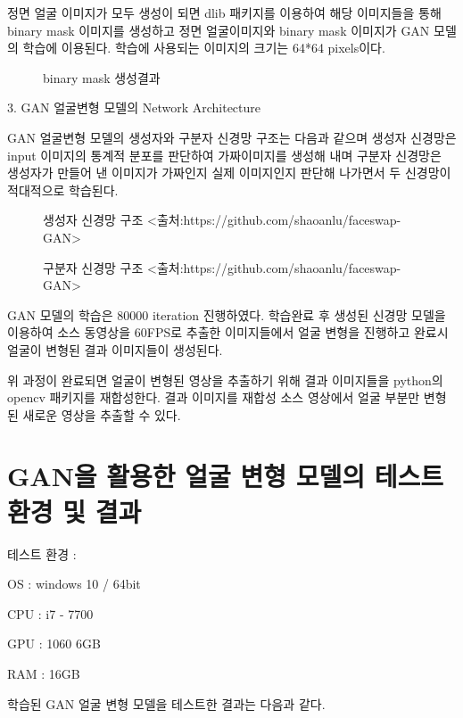 \documentclass{oblivoir}
\begin{document}
정면 얼굴 이미지가 모두 생성이 되면 dlib 패키지를 이용하여 해당 이미지들을 통해 binary mask 이미지를 생성하고 정면 얼굴이미지와 binary mask 이미지가 GAN 모델의 학습에 이용된다. 학습에 사용되는 이미지의 크기는 64*64 pixels이다. 
\begin{figure}[h!]%
    \centering
\caption{binary mask 생성결과}
\end{figure}


3. GAN 얼굴변형 모델의 Network Architecture

GAN 얼굴변형 모델의 생성자와 구분자 신경망 구조는 다음과 같으며 생성자 신경망은 input 이미지의 통계적 분포를 판단하여 가짜이미지를 생성해 내며 구분자 신경망은 생성자가 만들어 낸 이미지가 가짜인지 실제 이미지인지 판단해 나가면서 두 신경망이 적대적으로 학습된다.

\begin{figure}[h!]
    \centering
\caption{생성자 신경망 구조 <출처:https://github.com/shaoanlu/faceswap-GAN>}
\end{figure}


\begin{figure}[h!]
    \centering
\caption{구분자 신경망 구조 <출처:https://github.com/shaoanlu/faceswap-GAN>}
\end{figure}




GAN 모델의 학습은 80000 iteration 진행하였다. 학습완료 후 생성된 신경망 모델을 이용하여 소스 동영상을 60FPS로 추출한 이미지들에서 얼굴 변형을 진행하고 완료시 얼굴이 변형된 결과 이미지들이 생성된다.

위 과정이 완료되면 얼굴이 변형된 영상을 추출하기 위해 결과 이미지들을 python의 opencv 패키지를 재합성한다. 결과 이미지를 재합성 소스 영상에서 얼굴 부분만 변형된 새로운 영상을 추출할 수 있다.

\section{ GAN을 활용한 얼굴 변형 모델의 테스트 환경 및 결과}

테스트 환경 :

OS : windows 10 / 64bit

CPU : i7 - 7700

GPU : 1060 6GB

RAM : 16GB

학습된 GAN 얼굴 변형 모델을 테스트한 결과는 다음과 같다.
\end{document}
